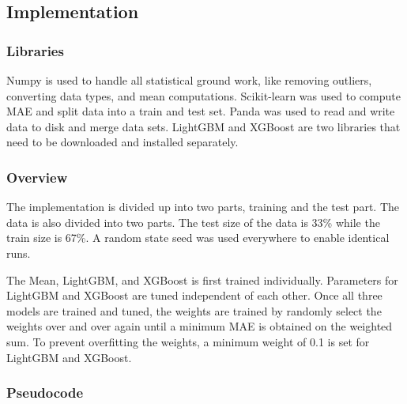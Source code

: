 \documentclass[a4paper]{article}
\begin{document}
\subsection{Implementation}
\subsubsection{Libraries}
Numpy is used to handle all statistical ground work, like removing outliers, converting data types, and mean computations. Scikit-learn was used to compute MAE and split data into a train and test set. Panda was used to read and write data to disk and merge data sets. LightGBM and XGBoost are two libraries that need to be downloaded and installed separately. 


\subsubsection{Overview}
The implementation is divided up into two parts, training and the test part. The data is also divided into two parts. The test size of the data is 33\% while the train size is 67\%. A random state seed was used everywhere to enable identical runs.

The Mean, LightGBM, and XGBoost is first trained individually. Parameters for LightGBM and XGBoost are tuned independent of each other. Once all three models are trained and tuned, the weights are trained by randomly select the weights over and over again until a minimum MAE is obtained on the weighted sum. To prevent overfitting the weights, a minimum weight of 0.1 is set for LightGBM and XGBoost. 


\subsubsection{Pseudocode}
\end{document}
